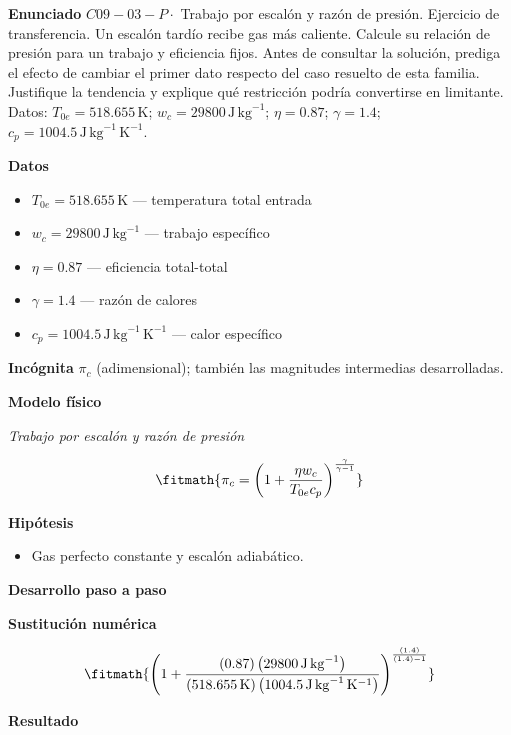 \documentclass[10pt,openany]{book}
\begin{document}
\noindent\textbf{Enunciado}
\(C09-03-P \cdot\) Trabajo por escalón y razón de presión. Ejercicio de transferencia. Un escalón tardío recibe gas más caliente. Calcule su relación de presión para un trabajo y eficiencia fijos. Antes de consultar la solución, prediga el efecto de cambiar el primer dato respecto del caso resuelto de esta familia. Justifique la tendencia y explique qué restricción podría convertirse en limitante. Datos: \(T_{0e}=518.655\, \mathrm{K}\); \(w_c=29800\, \mathrm{J}\,\mathrm{kg}^{-1}\); \(\eta=0.87\); \(\gamma=1.4\); \(c_p=1004.5\, \mathrm{J}\,\mathrm{kg}^{-1}\,\mathrm{K}^{-1}\).

\noindent\textbf{Datos}
\begin{itemize}
\item $T_{0e} = 518.655\,\mathrm{K}$ — temperatura total entrada
\item $w_c = 29800\,\mathrm{J}\,\mathrm{kg}^{-1}$ — trabajo específico
\item $\eta = 0.87$ — eficiencia total-total
\item $\gamma = 1.4$ — razón de calores
\item $c_p = 1004.5\,\mathrm{J}\,\mathrm{kg}^{-1}\,\mathrm{K}^{-1}$ — calor específico
\end{itemize}

\noindent\textbf{Incógnita}
$\pi_c$ (adimensional); también las magnitudes intermedias desarrolladas.

\noindent\textbf{Modelo físico}

\noindent\textit{Trabajo por escalón y razón de presión}

\[
\fitmath{\pi_c=\left(1 + \frac{\eta w_c}{T_{0e} c_p}\right)^{\frac{\gamma}{\gamma - 1}}}
\]

\noindent\textbf{Hipótesis}
\begin{itemize}
\item Gas perfecto constante y escalón adiabático.
\end{itemize}

\noindent\textbf{Desarrollo paso a paso}



\noindent\textbf{Sustitución numérica}

\[
\fitmath{\left(1 + \frac{\left(0.87\right) \left(29800\,\mathrm{J}\,\mathrm{kg}^{-1}\right)}{\left(518.655\,\mathrm{K}\right) \left(1004.5\,\mathrm{J}\,\mathrm{kg}^{-1}\,\mathrm{K}^{-1}\right)}\right)^{\frac{\left(1.4\right)}{\left(1.4\right) - 1}}}
\]

\noindent\textbf{Resultado}
\end{document}
